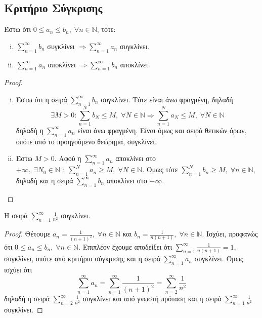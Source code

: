 \documentclass[main.tex]{subfiles}
\begin{document}
\subsection{Κριτήριο Σύγκρισης}
Έστω ότι $ 0 \leq a_{n} \leq b_{n}, \; \forall n \in \mathbb{N} $, τότε:
\begin{enumerate}[i)]
    \item $ \sum_{n=1}^{\infty} b_{n} $ συγκλίνει $ \Rightarrow \sum_{n=1}^{\infty} 
        a_{n}$ συγκλίνει.
    \item $ \sum_{n=1}^{\infty} a_{n} $ αποκλίνει $ \Rightarrow \sum_{n=1}^{\infty} 
        b_{n} $ αποκλίνει.
\end{enumerate}
\begin{proof}
\item {}
    \begin{enumerate}[i)]
        \item Έστω ότι η σειρά $ \sum_{n=1}^{\infty} b_{n} $ συγκλίνει. Τότε είναι 
            άνω φραγμένη, δηλαδή 
            \[
                \exists M>0 : \sum_{n=1}^{N} b_{N} \leq M, \; \forall N \in \mathbb{N}
                \Rightarrow \sum_{n=1}^{N} a_{N} \leq M, \; \forall N \in \mathbb{N}
            \]
            δηλαδή η $ \sum_{n=1}^{\infty} a_{n} $ είναι άνω φραγμένη. Είναι όμως και 
            σειρά θετικών όρων, οπότε από το προηγούμενο θεώρημα, συγκλίνει.

        \item Έστω $ M >0 $. Αφού η $ \sum_{n=1}^{\infty} a_{n} $ αποκλίνει στο $ 
            + \infty, \; \exists N_{0} \in \mathbb{N} \; : \; \sum_{n=1}^{N} a_{n} 
            \geq M, \; \forall N \in \mathbb{N} $. 
            Όμως τότε $ \sum_{n=1}^{N} b_{n} \geq M, \; \forall n \in \mathbb{N} $, 
            δηλαδή και η σειρά $ \sum_{n=1}^{\infty} b_{n} $ αποκλίνει στο $ 
            + \infty$.
    \end{enumerate}
\end{proof}

\begin{prop}
    Η σειρά $ \sum_{n=1}^{\infty} \frac{1}{n^{2}} $ συγκλίνει.
\end{prop}
\begin{proof}
\item {}
    Θέτουμε $ a_{n} = \frac{1}{(n+1)^{2}}, \; \forall n \in \mathbb{N} $ και 
    $ b_{n} = \frac{1}{n(n+1)}, \; \forall n \in \mathbb{N} $. Ισχύει, προφανώς ότι
    $ 0 \leq a_{n} \leq b_{n}, \; \forall n \in \mathbb{N} $. Επιπλέον έχουμε αποδείξει
    ότι $ \sum_{n=1}^{\infty} \frac{1}{n(n+1)} = 1 $, συγκλίνει, οπότε από κριτήριο 
    σύγκρισης και η σειρά 
    $ \sum_{n=1}^{\infty} a_{n} $ συγκλίνει. Όμως ισχύει ότι
    \[
        \sum_{n=1}^{\infty} a_{n} = \sum_{n=1}^{\infty} \frac{1}{(n+1)^{2}} = 
        \sum_{n=2}^{\infty} \frac{1}{n^{2}} 
    \] 
    δηλαδή η σειρά $ \sum_{n=2}^{\infty} \frac{1}{n^{2}} $ συγκλίνει και από γνωστή 
    πρόταση και η σειρά $ \sum_{n=1}^{\infty} \frac{1}{n^{2}} $ συγκλίνει.
\end{proof}
\end{document}
